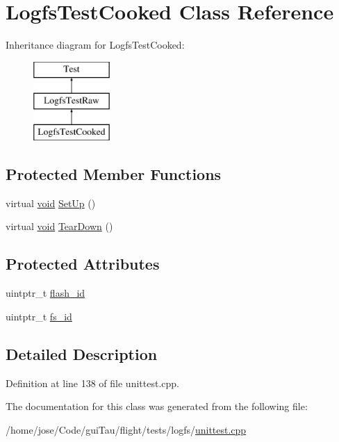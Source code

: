\hypertarget{class_logfs_test_cooked}{\section{Logfs\-Test\-Cooked Class Reference}
\label{class_logfs_test_cooked}
}
Inheritance diagram for Logfs\-Test\-Cooked\-:\begin{figure}[H]
\begin{center}
\leavevmode
\includegraphics[height=3.000000cm]{class_logfs_test_cooked}
\end{center}
\end{figure}
\subsection*{Protected Member Functions}
\begin{DoxyCompactItemize}
\item 
virtual \hyperlink{group___n_a_m_e_ga18028b8badbf1ea7e704ccac3c488e82}{void} \hyperlink{group___unit_tests_gafefb90c56c5d60e99e716775a5e60028}{Set\-Up} ()
\item 
virtual \hyperlink{group___n_a_m_e_ga18028b8badbf1ea7e704ccac3c488e82}{void} \hyperlink{group___unit_tests_gab1ca9799c18f4944962a0e5b88ca8c9d}{Tear\-Down} ()
\end{DoxyCompactItemize}
\subsection*{Protected Attributes}
\begin{DoxyCompactItemize}
\item 
uintptr\-\_\-t \hyperlink{group___unit_tests_ga1180d0088fd85cca978eaed59163f626}{flash\-\_\-id}
\item 
uintptr\-\_\-t \hyperlink{group___unit_tests_gaa47f085754c3a15dd69bcfbde0d804d7}{fs\-\_\-id}
\end{DoxyCompactItemize}


\subsection{Detailed Description}


Definition at line 138 of file unittest.\-cpp.



The documentation for this class was generated from the following file\-:\begin{DoxyCompactItemize}
\item 
/home/jose/\-Code/gui\-Tau/flight/tests/logfs/\hyperlink{logfs_2unittest_8cpp}{unittest.\-cpp}\end{DoxyCompactItemize}
